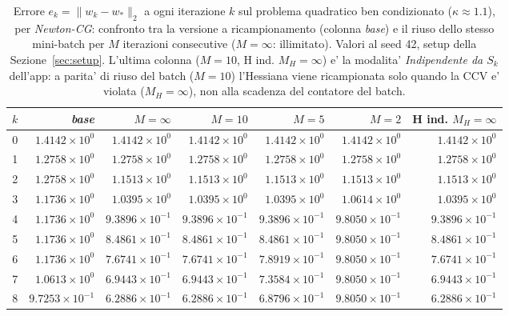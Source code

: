 \begin{table}[H]
\centering
\footnotesize
\renewcommand{\arraystretch}{0.85}
\setlength{\tabcolsep}{2pt}
\caption{Errore $e_k=\|w_k-w_*\|_2$ a ogni iterazione $k$ sul problema quadratico ben condizionato ($\kappa\approx 1.1$), per \emph{Newton-CG}: confronto tra la versione a ricampionamento (colonna \emph{base}) e il riuso dello stesso mini-batch per $M$ iterazioni consecutive ($M=\infty$: illimitato). Valori al seed 42, setup della Sezione~\ref{sec:setup}. L'ultima colonna ($M{=}10$, H ind. $M_H{=}\infty$) e' la modalita' \emph{Indipendente da $S_k$} dell'app: a parita' di riuso del batch ($M=10$) l'Hessiana viene ricampionata solo quando la CCV e' violata ($M_H=\infty$), non alla scadenza del contatore del batch.}
\label{tab:riuso_bencond_ncg}
\begin{tabular}{@{}rrrrrrr@{}}
\toprule
$k$ & \emph{base} & $M{=}\infty$ & $M{=}10$ & $M{=}5$ & $M{=}2$ & H ind. $M_H{=}\infty$\\
\midrule
0 & $1.4142\times10^{0}$ & $1.4142\times10^{0}$ & $1.4142\times10^{0}$ & $1.4142\times10^{0}$ & $1.4142\times10^{0}$ & $1.4142\times10^{0}$\\
1 & $1.2758\times10^{0}$ & $1.2758\times10^{0}$ & $1.2758\times10^{0}$ & $1.2758\times10^{0}$ & $1.2758\times10^{0}$ & $1.2758\times10^{0}$\\
2 & $1.2758\times10^{0}$ & $1.1513\times10^{0}$ & $1.1513\times10^{0}$ & $1.1513\times10^{0}$ & $1.1513\times10^{0}$ & $1.1513\times10^{0}$\\
3 & $1.1736\times10^{0}$ & $1.0395\times10^{0}$ & $1.0395\times10^{0}$ & $1.0395\times10^{0}$ & $1.0614\times10^{0}$ & $1.0395\times10^{0}$\\
4 & $1.1736\times10^{0}$ & $9.3896\times10^{-1}$ & $9.3896\times10^{-1}$ & $9.3896\times10^{-1}$ & $9.8050\times10^{-1}$ & $9.3896\times10^{-1}$\\
5 & $1.1736\times10^{0}$ & $8.4861\times10^{-1}$ & $8.4861\times10^{-1}$ & $8.4861\times10^{-1}$ & $9.8050\times10^{-1}$ & $8.4861\times10^{-1}$\\
6 & $1.1736\times10^{0}$ & $7.6741\times10^{-1}$ & $7.6741\times10^{-1}$ & $7.8919\times10^{-1}$ & $9.8050\times10^{-1}$ & $7.6741\times10^{-1}$\\
7 & $1.0613\times10^{0}$ & $6.9443\times10^{-1}$ & $6.9443\times10^{-1}$ & $7.3584\times10^{-1}$ & $9.8050\times10^{-1}$ & $6.9443\times10^{-1}$\\
8 & $9.7253\times10^{-1}$ & $6.2886\times10^{-1}$ & $6.2886\times10^{-1}$ & $6.8796\times10^{-1}$ & $9.8050\times10^{-1}$ & $6.2886\times10^{-1}$\\

\end{tabular}
\end{table}
